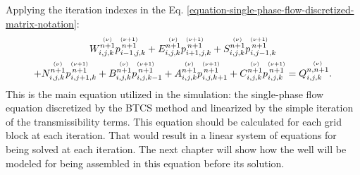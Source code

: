 %
Applying the iteration indexes in the Eq. \ref{equation-single-phase-flow-discretized-matrix-notation}:
%
\begin{multline}
	\label{equation-single-phase-flow-discretized-linearized}
	W^{\stackrel{(\nu)}{n+1}}_{i,j,k}p^{\stackrel{\Large{(\nu+1)}}{n+1}}_{i-1,j,k}+E^{\stackrel{(\nu)}{n+1}}_{i,j,k}p^{\stackrel{(\nu+1)}{n+1}}_{i+1,j,k}+S^{\stackrel{(\nu)}{n+1}}_{i,j,k}p^{\stackrel{(\nu+1)}{n+1}}_{i,j-1,k}\\+N^{\stackrel{(\nu)}{n+1}}_{i,j,k}p^{\stackrel{(\nu+1)}{n+1}}_{i,j+1,k}+B^{\stackrel{(\nu)}{n+1}}_{i,j,k}p^{\stackrel{(\nu+1)}{n+1}}_{i,j,k-1}+A^{\stackrel{(\nu)}{n+1}}_{i,j,k}p^{\stackrel{(\nu+1)}{n+1}}_{i,j,k+1}+C^{\stackrel{(\nu)}{n+1}}_{i,j,k}p^{\stackrel{(\nu+1)}{n+1}}_{i,j,k}=Q^{\stackrel{(\nu)}{n,n+1}}_{i,j,k}.
\end{multline}
%
This is the main equation utilized in the simulation: the single-phase flow equation discretized by the BTCS method and linearized by the simple iteration of the transmissibility terms.
%
This equation should be calculated for each grid block at each iteration.
%
That would result in a linear system of equations for being solved at each iteration.
%
The next chapter will show how the well will be modeled for being assembled in this equation before its solution.

